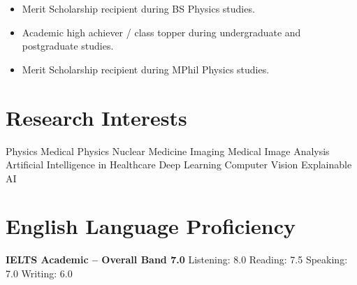 \documentclass[10.5pt,a4paper]{article}
\begin{document}
\begin{itemize}

    \item Merit Scholarship recipient during BS Physics studies.

    \item Academic high achiever / class topper during undergraduate
    and postgraduate studies.

    \item Merit Scholarship recipient during MPhil Physics studies.

\end{itemize}



\section{Research Interests}

Physics \textbar{}
Medical Physics \textbar{}
Nuclear Medicine Imaging \textbar{}
Medical Image Analysis \textbar{}
Artificial Intelligence in Healthcare \textbar{}
Deep Learning \textbar{}
Computer Vision \textbar{}
Explainable AI



\section{English Language Proficiency}

\textbf{IELTS Academic -- Overall Band 7.0}
\quad
Listening: 8.0 \textbar{}
Reading: 7.5 \textbar{}
Speaking: 7.0 \textbar{}
Writing: 6.0
\end{document}
